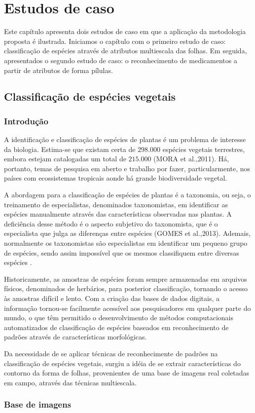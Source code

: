 
\chapter{Estudos de caso}
Este capítulo apresenta dois estudos de caso em que a aplicação da metodologia proposta é ilustrada. Iniciamos o capítulo com o primeiro estudo de caso: classificação de espécies através de atributos multiescala das folhas. Em seguida, apresentados o segundo estudo de caso: o reconhecimento de medicamentos a partir de atributos de forma pílulas.

\section{Classificação de espécies vegetais}

\subsection{Introdução}

A identificação e classificação de espécies de plantas é um problema de interesse da biologia. Estima-se que existam certa de $298.000$ espécies vegetais terrestres, embora estejam catalogadas um total de $215.000$ (MORA et al.,2011). Há, portanto, temas de pesquisa em aberto e trabalho por fazer, particularmente, nos países com ecossistemas tropicais aonde há grande biodiversidade vegetal.

A abordagem para a classificação de espécies de plantas é a taxonomia, ou seja, o treinamento de especialistas, denominados taxonomistas, em identificar as espécies manualmente  através das características observadas nas plantas. A deficiência desse método é o aspecto subjetivo do taxonomista, que é o especialista que julga as diferenças entre espécies (GOMES et al.,2013). Ademais, normalmente os taxonomistas são especialistas em identificar um pequeno grupo de espécies, sendo assim impossível que os mesmos classifiquem entre diversas espécies \cite{Cope20127562}.

Historicamente, as amostras de espécies foram sempre armazenadas em arquivos físicos, denominados de herbários, para posterior classificação, tornando o acesso às amostras difícil e lento. Com a criação das bases de dados digitais, a informação tornou-se facilmente acessível aos pesquisadores em qualquer parte do mundo, o que têm permitido o desenvolvimento de métodos computacionais automatizados de classificação de espécies baseados em reconhecimento de padrões através de características morfológicas.

Da necessidade de se aplicar técnicas de reconhecimente de padrões na classificação de espécies vegetais, surgiu a idéia de se extrair características do contorno da forma de folhas, provenientes de uma base de imagens real coletadas em campo, através das técnicas multiescala.

\subsection{Base de imagens}

